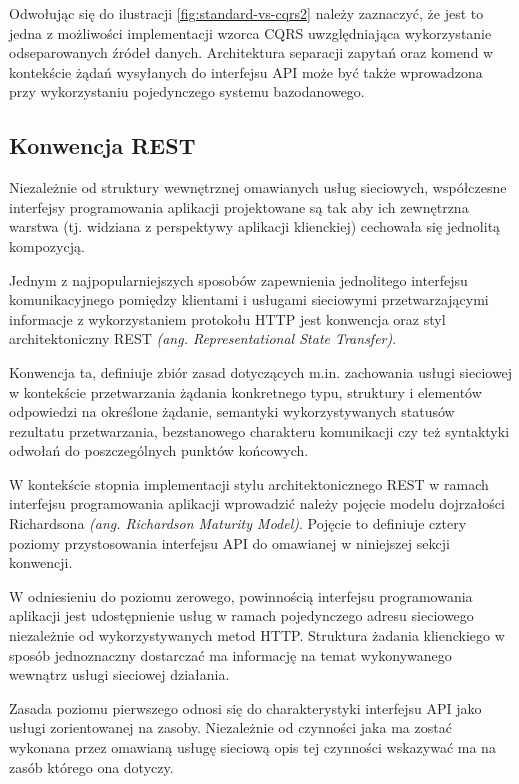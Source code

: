 Odwołując się do ilustracji \ref{fig:standard-vs-cqrs2} należy zaznaczyć, że jest to jedna z możliwości implementacji wzorca CQRS uwzględniająca wykorzystanie odseparowanych źródeł danych. Architektura separacji zapytań oraz komend w kontekście żądań wysyłanych do interfejsu API może być także wprowadzona przy wykorzystaniu pojedynczego systemu bazodanowego.

\subsection*{Konwencja REST}
Niezależnie od struktury wewnętrznej omawianych usług sieciowych, współczesne interfejsy programowania aplikacji projektowane są tak aby ich zewnętrzna warstwa (tj. widziana z perspektywy aplikacji klienckiej) cechowała się jednolitą kompozycją.

Jednym z najpopularniejszych sposobów zapewnienia jednolitego interfejsu komunikacyjnego pomiędzy klientami i usługami sieciowymi przetwarzającymi informacje z wykorzystaniem protokołu HTTP jest konwencja oraz styl architektoniczny REST \textit{(ang. Representational State Transfer)}.

Konwencja ta, definiuje zbiór zasad dotyczących m.in. zachowania usługi sieciowej w kontekście przetwarzania żądania konkretnego typu, struktury i elementów odpowiedzi na określone żądanie, semantyki wykorzystywanych statusów rezultatu przetwarzania, bezstanowego charakteru komunikacji czy też syntaktyki odwołań do poszczególnych punktów końcowych.

W kontekście stopnia implementacji stylu architektonicznego REST w ramach interfejsu programowania aplikacji wprowadzić należy pojęcie modelu dojrzałości Richardsona \textit{(ang. Richardson Maturity Model)}. Pojęcie to definiuje cztery poziomy przystosowania interfejsu API do omawianej w niniejszej sekcji konwencji.

W odniesieniu do poziomu zerowego, powinnością interfejsu programowania aplikacji jest udostępnienie usług w ramach pojedynczego adresu sieciowego niezależnie od wykorzystywanych metod HTTP. Struktura żadania klienckiego w sposób jednoznaczny dostarczać ma informację na temat wykonywanego wewnątrz usługi sieciowej działania.

Zasada poziomu pierwszego odnosi się do charakterystyki interfejsu API jako usługi zorientowanej na zasoby. Niezależnie od czynności jaka ma zostać wykonana przez omawianą usługę sieciową opis tej czynności wskazywać ma na zasób którego ona dotyczy.

